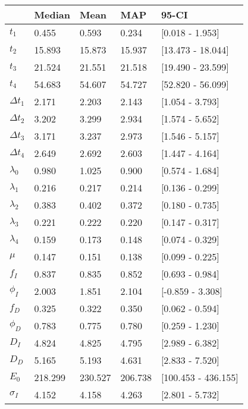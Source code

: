 \begin{tabular}{lllll}
\toprule
{} &   Median &     Mean &      MAP &                95-CI \\
\midrule
$t_1$        &    0.455 &    0.593 &    0.234 &      [0.018 - 1.953] \\
$t_2$        &   15.893 &   15.873 &   15.937 &    [13.473 - 18.044] \\
$t_3$        &   21.524 &   21.551 &   21.518 &    [19.490 - 23.599] \\
$t_4$        &   54.683 &   54.607 &   54.727 &    [52.820 - 56.099] \\
$\Delta t_1$ &    2.171 &    2.203 &    2.143 &      [1.054 - 3.793] \\
$\Delta t_2$ &    3.202 &    3.299 &    2.934 &      [1.574 - 5.652] \\
$\Delta t_3$ &    3.171 &    3.237 &    2.973 &      [1.546 - 5.157] \\
$\Delta t_4$ &    2.649 &    2.692 &    2.603 &      [1.447 - 4.164] \\
$\lambda_0$  &    0.980 &    1.025 &    0.900 &      [0.574 - 1.684] \\
$\lambda_1$  &    0.216 &    0.217 &    0.214 &      [0.136 - 0.299] \\
$\lambda_2$  &    0.383 &    0.402 &    0.372 &      [0.180 - 0.735] \\
$\lambda_3$  &    0.221 &    0.222 &    0.220 &      [0.147 - 0.317] \\
$\lambda_4$  &    0.159 &    0.173 &    0.148 &      [0.074 - 0.329] \\
$\mu$        &    0.147 &    0.151 &    0.138 &      [0.099 - 0.225] \\
$f_I$        &    0.837 &    0.835 &    0.852 &      [0.693 - 0.984] \\
$\phi_I$     &    2.003 &    1.851 &    2.104 &     [-0.859 - 3.308] \\
$f_D$        &    0.325 &    0.322 &    0.350 &      [0.062 - 0.594] \\
$\phi_D$     &    0.783 &    0.775 &    0.780 &      [0.259 - 1.230] \\
$D_I$        &    4.824 &    4.825 &    4.795 &      [2.989 - 6.382] \\
$D_D$        &    5.165 &    5.193 &    4.631 &      [2.833 - 7.520] \\
$E_0$        &  218.299 &  230.527 &  206.738 &  [100.453 - 436.155] \\
$\sigma_I$   &    4.152 &    4.158 &    4.263 &      [2.801 - 5.732] \\

\end{tabular}
